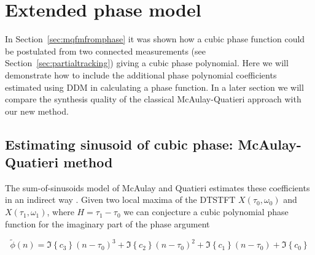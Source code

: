 \chapter{Extended phase model \label{chap:exphsmodel}}

In Section~\ref{sec:mqfmfromphase} it was shown how a cubic phase function could
be postulated from two connected measurements (see
Section~\ref{sec:partialtracking}) giving a cubic phase polynomial. Here we will
demonstrate how to include the additional phase polynomial coefficients
estimated using DDM in calculating a phase function. In a later section we will
compare the synthesis quality of the classical McAulay-Quatieri
approach with our new method.

\section{Estimating sinusoid of cubic phase: McAulay-Quatieri method}

The sum-of-sinusoids model of McAulay and Quatieri estimates these coefficients
in an indirect way \cite{mcaulay1986speech}. Given two local maxima of the
DTSTFT $X(\tau_0,\omega_0)$ and $X(\tau_1,\omega_1)$, where $H = \tau_1 -
\tau_0$ we can conjecture a cubic
polynomial phase function for the imaginary part of the phase argument

\begin{equation}
    \tilde{\phi}(n) = \Im\left\{c_3\right\} (n-\tau_0)^3 + \Im\left\{c_2\right\} (n-\tau_0)^2 + \Im\left\{c_1\right\} (n-\tau_0) + \Im\left\{c_0\right\}
\end{equation}

